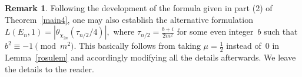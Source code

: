\documentclass[11pt, reqno]{amsart}
\theoremstyle{plain}
\newtheorem{proposition}[theorem]{Proposition}
\theoremstyle{definition}
\newtheorem{remark}[theorem]{Remark}
\numberwithin{equation}{section}
\begin{document}
\begin{remark}\label{rem1}
    Following the development of the formula given in part (2) of Theorem~\ref{main4}, one may also establish the alternative formulation
    $L(E_{n},1)={\left|\theta_{\chi_{2n}}\left(\tau_{n/2}/4\right)\right|}, $
    where $\tau_{n/2}=\frac{b+i}{2m^{2}}$ for some even integer~$b$ such that $b^{2}\equiv-1\pmod{m^{2}}$. This basically follows from taking $\mu=\frac{1}{2}$ instead of~$0$ in Lemma~\ref{rosulem} and accordingly modifying all the details afterwards. We leave the details to the reader.
\end{remark}
    






    
\end{document}
